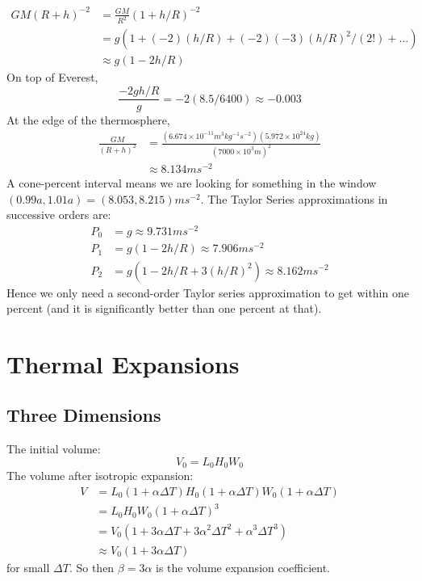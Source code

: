 \documentclass{article}
\begin{document}
\begin{align*}
GM(R+h)^{-2} &= \frac{GM}{R^2}(1+h/R)^{-2} \\
&= g(1 + (-2)(h/R) + (-2)(-3)(h/R)^2/(2!) + ...) \\
&\approx g(1-2h/R)
\end{align*}
On top of Everest,
\begin{equation}
\frac{-2gh/R}{g} = -2(8.5/6400) \approx -0.003
\end{equation}
At the edge of the thermosphere,
\begin{align*}
\frac{GM}{(R+h)^2} &= \frac{(6.674\times10^{-11} m^3 kg^{-1} s^{-2})(5.972\times 10^{24} kg)}{(7000 \times 10^3 m)^2} \\
&\approx 8.134 m s^{-2}
\end{align*}
A cone-percent interval means we are looking for something in the window $(0.99a,1.01a)=(8.053,8.215) m s^{-2}$. The Taylor Series approximations in successive orders are:
\begin{align*}
P_0 &= g \approx 9.731 m s^{-2} \\
P_1 &= g(1-2h/R) \approx 7.906 m s^{-2} \\
P_2 &= g(1-2h/R+3(h/R)^2) \approx 8.162 m s^{-2}
\end{align*}
Hence we only need a second-order Taylor series approximation to get within one percent (and it is significantly better than one percent at that).

\newpage

\section{Thermal Expansions}

\subsection{Three Dimensions}

The initial volume:
\begin{equation}
V_0 = L_0 H_0 W_0
\end{equation}
The volume after isotropic expansion:
\begin{align*}
V &= L_0(1+\alpha\Delta T)H_0(1 + \alpha\Delta T)W_0(1 + \alpha\Delta T) \\
&= L_0H_0W_0(1+\alpha\Delta T)^3 \\
&= V_0(1+3\alpha\Delta T + 3\alpha^2\Delta T^2 + \alpha^3\Delta T^3) \\
&\approx V_0(1+3\alpha\Delta T)
\end{align*}
for small $\Delta T$. So then $\beta = 3\alpha$ is the volume expansion coefficient.
\end{document}
